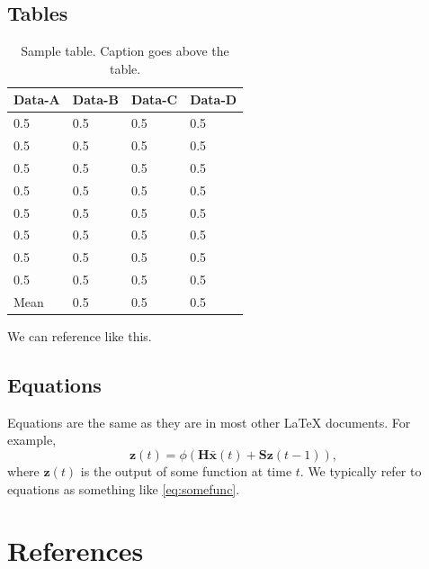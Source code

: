 \documentclass[master]{thesis}
\begin{document}
\section{Tables}

\begin{table}[hp]
    \caption{Sample table.  Caption goes above the table.}
    \label{table:sample}
    \begin{center}
        \begin{tabular}{@{}*{4}{l}} %
            \toprule
            Data-A  & Data-B    & Data-C    & Data-D \\
            \midrule
            0.5     & 0.5       & 0.5       & 0.5   \\
            0.5     & 0.5       & 0.5       & 0.5   \\
            0.5     & 0.5       & 0.5       & 0.5   \\
            0.5     & 0.5       & 0.5       & 0.5   \\
            0.5     & 0.5       & 0.5       & 0.5   \\
            0.5     & 0.5       & 0.5       & 0.5   \\
            0.5     & 0.5       & 0.5       & 0.5   \\
            0.5     & 0.5       & 0.5       & 0.5   \\
            \midrule
            Mean    & 0.5       & 0.5       & 0.5   \\
            \bottomrule
        \end{tabular}
    \end{center}
\end{table}

We can reference  like this.

\section{Equations}

Equations are the same as they are in most other \LaTeX{} documents.  For example,
\begin{equation}
    \mathbf{z}(t) = \phi(\mathbf{H} \bar{\mathbf{x}}(t) + \mathbf{S} \mathbf{z}(t-1)),
    \label{eq:somefunc}
\end{equation}
where $\mathbf{z}(t)$ is the output of some function at time $t$.  We typically refer to equations as something like \eqref{eq:somefunc}.

\chapter{References}
\end{document}
